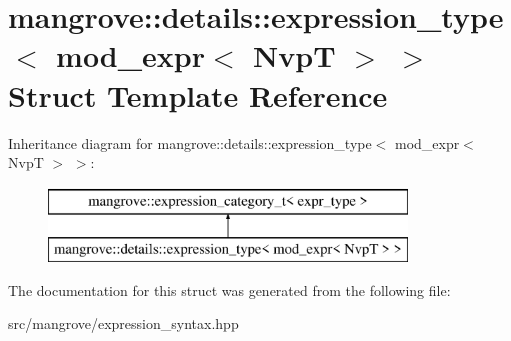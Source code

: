 \hypertarget{structmangrove_1_1details_1_1expression__type_3_01mod__expr_3_01NvpT_01_4_01_4}{}\section{mangrove\+:\+:details\+:\+:expression\+\_\+type$<$ mod\+\_\+expr$<$ NvpT $>$ $>$ Struct Template Reference}
\label{structmangrove_1_1details_1_1expression__type_3_01mod__expr_3_01NvpT_01_4_01_4}
Inheritance diagram for mangrove\+:\+:details\+:\+:expression\+\_\+type$<$ mod\+\_\+expr$<$ NvpT $>$ $>$\+:\begin{figure}[H]
\begin{center}
\leavevmode
\includegraphics[height=2.000000cm]{structmangrove_1_1details_1_1expression__type_3_01mod__expr_3_01NvpT_01_4_01_4}
\end{center}
\end{figure}


The documentation for this struct was generated from the following file\+:\begin{DoxyCompactItemize}
\item 
src/mangrove/expression\+\_\+syntax.\+hpp\end{DoxyCompactItemize}
